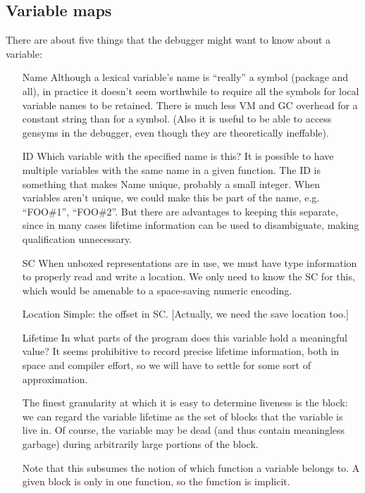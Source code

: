 

\subsection{Variable maps}

There are about five things that the debugger might want to know about a
variable:
\begin{itemize}

\item[Name]
	Although a lexical variable's name is ``really'' a symbol (package and
	all), in practice it doesn't seem worthwhile to require all the symbols
	for local variable names to be retained.  There is much less VM and GC
	overhead for a constant string than for a symbol.  (Also it is useful
	to be able to access gensyms in the debugger, even though they are
	theoretically ineffable).

\item[ID]
	Which variable with the specified name is this?  It is possible to have
	multiple variables with the same name in a given function.  The ID is
	something that makes Name unique, probably a small integer.  When
	variables aren't unique, we could make this be part of the name, e.g.
	``FOO\#1'', ``FOO\#2''.  But there are advantages to keeping this separate,
	since in many cases lifetime information can be used to disambiguate,
	making qualification unnecessary.

\item[SC]
	When unboxed representations are in use, we must have type information
	to properly read and write a location.  We only need to know the
	SC for this, which would be amenable to a space-saving
	numeric encoding.

\item[Location]
	Simple: the offset in SC.  [Actually, we need the save location too.]

\item[Lifetime]
	In what parts of the program does this variable hold a meaningful
	value?  It seems prohibitive to record precise lifetime information,
	both in space and compiler effort, so we will have to settle for some
	sort of approximation.

	The finest granularity at which it is easy to determine liveness is
	the block: we can regard the variable lifetime as the set of blocks
	that the variable is live in.  Of course, the variable may be dead (and
	thus contain meaningless garbage) during arbitrarily large portions of
	the block.

	Note that this subsumes the notion of which function a variable belongs
	to.  A given block is only in one function, so the function is
	implicit.
\end{itemize}

